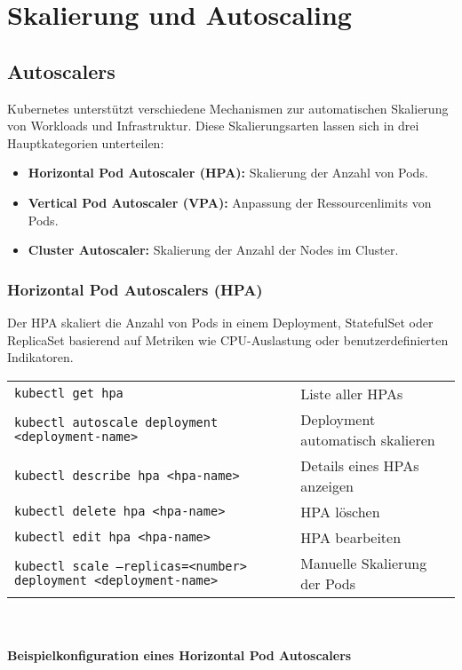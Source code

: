 \chapter{Skalierung und Autoscaling}

\section{Autoscalers}
Kubernetes unterstützt verschiedene Mechanismen zur automatischen Skalierung von Workloads und Infrastruktur. Diese Skalierungsarten lassen sich in drei Hauptkategorien unterteilen:
\begin{itemize}
    \item \textbf{Horizontal Pod Autoscaler (HPA):} Skalierung der Anzahl von Pods.
    \item \textbf{Vertical Pod Autoscaler (VPA):} Anpassung der Ressourcenlimits von Pods.
    \item \textbf{Cluster Autoscaler:} Skalierung der Anzahl der Nodes im Cluster.
\end{itemize}


\subsection{Horizontal Pod Autoscalers (HPA)}
Der HPA skaliert die Anzahl von Pods in einem Deployment, StatefulSet oder ReplicaSet basierend auf Metriken wie CPU-Auslastung oder benutzerdefinierten Indikatoren. \\

\noindent
\begin{tabular}{|p{}|p{}|}
\hline
\texttt{kubectl get hpa} & Liste aller HPAs \\
\texttt{kubectl autoscale deployment <deployment-name>} & Deployment automatisch skalieren \\
\texttt{kubectl describe hpa <hpa-name>} & Details eines HPAs anzeigen \\
\texttt{kubectl delete hpa <hpa-name>} & HPA löschen \\
\texttt{kubectl edit hpa <hpa-name>} & HPA bearbeiten \\
\texttt{kubectl scale --replicas=<number> deployment <deployment-name>} & Manuelle Skalierung der Pods \\
\hline
\end{tabular}
\phantom{.}\\
\noindent
\subsubsection{Beispielkonfiguration eines Horizontal Pod Autoscalers}

\newpage
